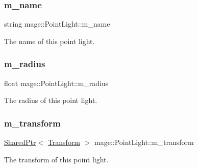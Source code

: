 \subsubsection{\texorpdfstring{m\+\_\+name}{m\_name}}
{\footnotesize\ttfamily string mage\+::\+Point\+Light\+::m\+\_\+name\hspace{0.3cm}{\ttfamily [private]}}

The name of this point light. \hypertarget{structmage_1_1_point_light_a04459adec2eaadc457799e4399b5df1f}{}\label{structmage_1_1_point_light_a04459adec2eaadc457799e4399b5df1f} 
\subsubsection{\texorpdfstring{m\+\_\+radius}{m\_radius}}
{\footnotesize\ttfamily float mage\+::\+Point\+Light\+::m\+\_\+radius\hspace{0.3cm}{\ttfamily [private]}}

The radius of this point light. \hypertarget{structmage_1_1_point_light_a080be38309dd4dba28ac0fc65d99756e}{}\label{structmage_1_1_point_light_a080be38309dd4dba28ac0fc65d99756e} 
\subsubsection{\texorpdfstring{m\+\_\+transform}{m\_transform}}
{\footnotesize\ttfamily \hyperlink{namespacemage_a1e01ae66713838a7a67d30e44c67703e}{Shared\+Ptr}$<$ \hyperlink{structmage_1_1_transform}{Transform} $>$ mage\+::\+Point\+Light\+::m\+\_\+transform\hspace{0.3cm}{\ttfamily [private]}}

The transform of this point light. 